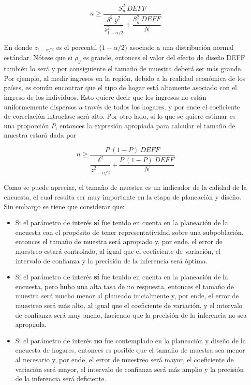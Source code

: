 \documentclass[12pt,spanish,]{book}
\providecommand{\tightlist}{%
  \setlength{\itemsep}{0pt}\setlength{\parskip}{0pt}}
\begin{document}
\[ 
n \geq \dfrac{S^2_{y}\ DEFF}{\dfrac{\delta^2 \  \bar{y}^2}{z_{1-\alpha/2}^2}+\dfrac{S^2_{y}\ DEFF}{N}}
\]

En donde \(z_{1-\alpha/2}\) es el percentil (\(1- \alpha/2\)) asociado a una distribución normal estándar. Nótese que si \(\rho_y\) es grande, entonces el valor del efecto de diseño DEFF también lo será y por consiguiente el tamaño de muestra deberá ser más grande. Por ejemplo, al medir ingresos en la región, debido a la realidad económica de los países, es común encontrar que el tipo de hogar está altamente asociado con el ingreso de los individuos. Esto quiere decir que los ingresos no están uniformemente dispersos a través de todos los hogares, y por ende el coeficiente de correlación intraclase será alto. Por otro lado, si lo que se quiere estimar es una proporción \(P\), entonces la expresión apropiada para calcular el tamaño de muestra estará dada por

\[ 
n \geq \dfrac{P\ (1-P)\ DEFF}{\dfrac{\delta^2}{z_{1-\alpha/2}^2 }+\dfrac{P\ (1-P) \ DEFF}{N}}
\]

Como se puede apreciar, el tamaño de muestra es un indicador de la calidad de la encuesta, el cual resulta ser muy importante en la etapa de planeación y diseño. Sin embargo se tiene que considerar que:

\begin{itemize}
\tightlist
\item
  Si el parámetro de interés \textbf{sí} fue tenido en cuenta en la planeación de la encuesta con el propósito de tener representatividad sobre una subpoblación, entonces el tamaño de muestra será apropiado y, por ende, el error de muestreo estará controlado, al igual que el coeficiente de variación, el intervalo de confianza y la precisión de la inferencia será óptima.
\item
  Si el parámetro de interés \textbf{sí} fue tenido en cuenta en la planeación de la encuesta, pero hubo una alta tasa de no respuesta, entonces el tamaño de muestra será mucho menor al planeado inicialmente y, por ende, el error de muestreo será más alto, al igual que el coeficiente de variación, y el intervalo de confianza será muy ancho, haciendo que la precisión de la inferencia no sea apropiada.
\item
  Si el parámetro de interés \textbf{no} fue contemplado en la planeación y diseño de la encuesta de hogares, entonces es posible que el tamaño de muestra sea menor al necesario y, por ende, el error de muestreo será mayor, el coeficiente de variación será mayor, el intervalo de confianza será más amplio y la precisión de la inferencia será deficiente.
\end{itemize}
\end{document}
